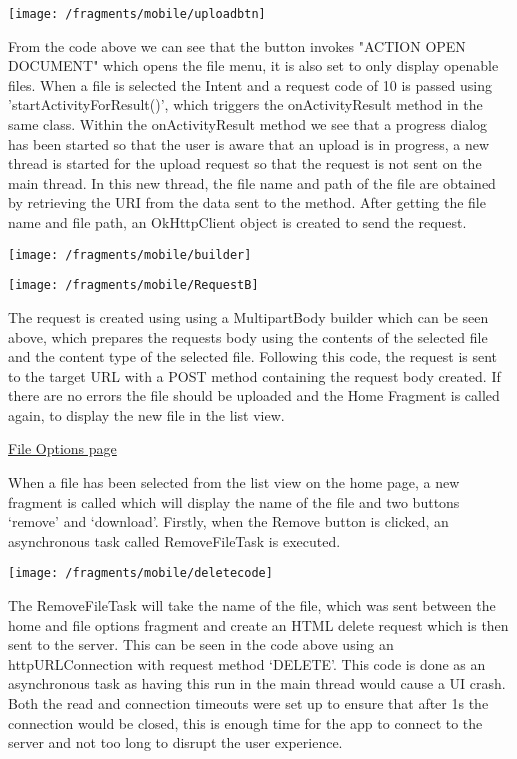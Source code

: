 \documentclass{article}
\begin{document}
\texttt{[image: /fragments/mobile/uploadbtn]}

From the code above we can see that the button invokes "ACTION OPEN DOCUMENT" which opens the file menu, it is also set to only display openable files. When a file is selected the Intent and a request code of 10 is passed using 'startActivityForResult()', which triggers the onActivityResult method in the same class. Within the onActivityResult method we see that a progress dialog has been started so that the user is aware that an upload is in progress, a new thread is started for the upload request so that the request is not sent on the main thread. In this new thread, the file name and path of the file are obtained by retrieving the URI from the data sent to the method. After getting the file name and file path, an OkHttpClient object is created to send the request. 

\texttt{[image: /fragments/mobile/builder]}

\texttt{[image: /fragments/mobile/RequestB]}

The request is created using using a MultipartBody builder which can be seen above, which prepares the requests body using the contents of the selected file and the content type of the selected file. Following this code, the request is sent to the target URL with a POST method containing the request body created. If there are no errors the file should be uploaded and the Home Fragment is called again, to display the new file in the list view. 

\underline{File Options page}

When a file has been selected from the list view on the home page, a new fragment is called which will display the name of the file and two buttons ‘remove’ and ‘download’. Firstly, when the Remove button is clicked, an asynchronous task called RemoveFileTask is executed. 

\texttt{[image: /fragments/mobile/deletecode]}

The RemoveFileTask will take the name of the file, which was sent between the home and file options fragment and create an HTML delete request which is then sent to the server. This can be seen in the code above using an httpURLConnection with request method ‘DELETE’. This code is done as an asynchronous task as having this run in the main thread would cause a UI crash. Both the read and connection timeouts were set up to ensure that after 1s the connection would be closed, this is enough time for the app to connect to the server and not too long to disrupt the user experience.
\end{document}
